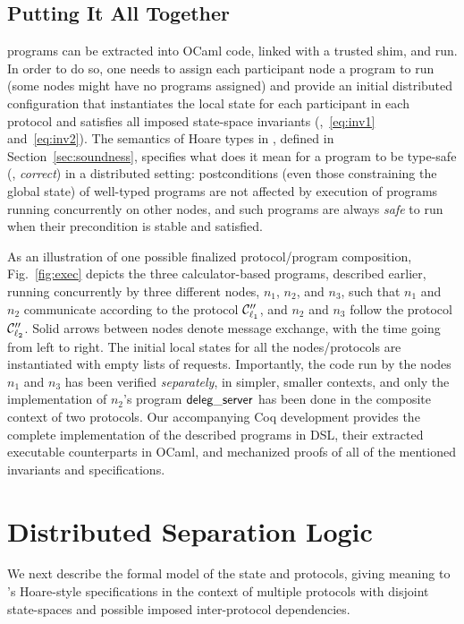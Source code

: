 \subsection{Putting It All Together}
\label{sec:all-together}

\disel programs can be extracted into OCaml code, linked with a
trusted shim, and run. In order to do so, one needs to assign each
participant node a program to run (some nodes might have no programs
assigned) and provide an initial distributed configuration that
instantiates the local state for each participant in each protocol and
satisfies all imposed state-space invariants (\eg,~\eqref{eq:inv1}
and~\eqref{eq:inv2}). The semantics of Hoare types in \disel, defined
in Section~\ref{sec:soundness}, specifies what does it mean for a
program to be type-safe (\ie, \emph{correct}) in a distributed
setting: postconditions (even those constraining the global state) of
well-typed programs are not affected by execution of programs running
concurrently on other nodes, and such programs are always \emph{safe}
to run when their precondition is stable and satisfied.

As an illustration of one possible finalized protocol/program
composition, Fig.~\ref{fig:exec} depicts the three calculator-based
programs, described earlier, running concurrently by three different
nodes, $n_1$, $n_2$, and $n_3$, such that $n_1$ and $n_2$ communicate
according to the protocol $\mathcal{C}''_{\ell_1}$, and $n_2$ and $n_3$
follow the protocol $\mathcal{C}''_{\ell_2}$.
%
Solid arrows between nodes denote message exchange, with the time
going from left to right.  The initial local states for all the
nodes/protocols are instantiated with empty lists of requests.
%
Importantly, the code run by the nodes $n_1$ and $n_3$ has been
verified \emph{separately}, in simpler, smaller contexts, and only the
implementation of $n_2$'s program $\mathsf{deleg\_server}$ has been done in the
composite context of two protocols.
%
Our accompanying Coq development provides the complete implementation
of the described programs in \disel DSL, their extracted executable
counterparts in OCaml, and mechanized proofs of all of the mentioned
invariants and specifications.

\section{Distributed Separation Logic}
\label{sec:logic}

We next describe the formal model of the state and protocols, giving
meaning to \disel's Hoare-style specifications in the context of
multiple protocols with disjoint state-spaces and possible
imposed inter-protocol dependencies.

